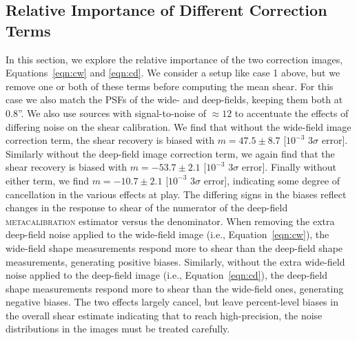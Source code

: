 \documentclass[twocolumn]{openjournal}
\makeatletter
\newcommand{\mcal}{\textsc{metacalibration}\@\xspace}
\makeatother
\begin{document}
\subsection{Relative Importance of Different Correction Terms}\label{sec:terms}

In this section, we explore the relative importance of the two correction images,
Equations~\ref{eqn:cw} and \ref{eqn:cd}. We consider a setup like case 1 above, but we
remove one or both of these terms before computing the mean shear. For this case we also
match the PSFs of the wide- and deep-fields, keeping them both at 0.8''. We also use
sources with signal-to-noise of $\approx12$ to accentuate the effects of differing noise
on the shear calibration. We find that without the wide-field image correction term, the
shear recovery is biased with $m=47.5\pm8.7$ [$10^{-3}$ $3\sigma$ error]. Similarly
without the deep-field image correction term, we again find that the shear recovery is biased
with $m=-53.7\pm2.1$ [$10^{-3}$ $3\sigma$ error]. Finally without either term, we find
$m=-10.7\pm2.1$ [$10^{-3}$ $3\sigma$ error], indicating some degree of cancellation in
the various effects at play. The differing signs in the biases reflect changes in the
response to shear of the numerator of the deep-field \mcal estimator versus the
denominator. When removing the extra deep-field noise applied to the wide-field image
(i.e., Equation~\ref{eqn:cw}), the wide-field shape measurements respond more to shear
than the deep-field shape measurements, generating positive biases. Similarly, without
the extra wide-field noise applied to the deep-field image (i.e.,
Equation~\ref{eqn:cd}), the deep-field shape measurements respond more to shear than the
wide-field ones, generating negative biases. The two effects largely cancel, but leave
percent-level biases in the overall shear estimate indicating that to reach
high-precision, the noise distributions in the images must be treated carefully.
\end{document}
